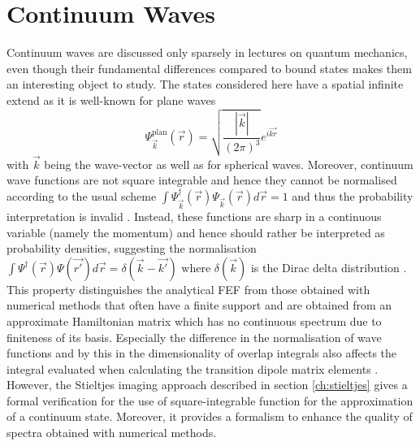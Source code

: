 \section{Continuum Waves}
\label{ch:contwa}
Continuum waves are discussed only sparsely in lectures on quantum mechanics, even though their fundamental differences compared to bound states makes them an interesting object to study.
The states considered here have a spatial infinite extend as it is well-known for plane waves 
\begin{equation}\label{eq:PlWave}
\Psi^\text{plan}_{\vec{k}} (\vec{r})=\sqrt{\frac{|\vec{k}|}{(2\pi)^3}}e^{i\vec{kr}}
\end{equation}
with $\vec{k}$ being the wave-vector as well as for spherical waves. %
Moreover, continuum wave functions are not square integrable and hence they cannot be normalised according to the usual scheme $\int \Psi_{\vec{k}}^\dagger(\vec{r})\Psi_{\vec{k}}(\vec{r}) d\vec{r}=1$ and thus the probability interpretation is invalid \cite{quirky}.
Instead, these functions are sharp in a continuous variable (namely the momentum) and hence should rather be interpreted as probability densities, suggesting the normalisation 
$\int \Psi^\dagger(\vec{r})\Psi(\vec{r'}) d\vec{r}=\delta(\vec{k}-\vec{k'})$ where $\delta(\vec{k})$ is the Dirac delta distribution \cite{quirky,ContOrb}.
This property distinguishes the analytical FEF from those obtained with numerical methods that often have a finite support and are obtained from an approximate Hamiltonian matrix which has no continuous spectrum due to finiteness of its basis.
Especially the difference in the normalisation of wave functions and by this in the dimensionality of overlap integrals also affects the integral evaluated when calculating the transition dipole matrix elements \cite{stieltjesCeder}.
However, the Stieltjes imaging approach described in section \ref{ch:stieltjes} gives a formal verification for the use of square-integrable function for the approximation of a continuum state. %
Moreover, it provides a formalism to enhance the quality of spectra obtained with numerical methods.

